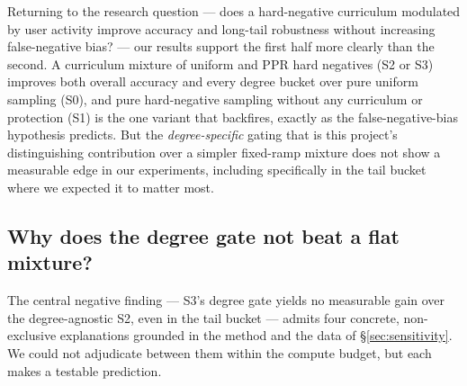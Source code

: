 \documentclass{article}
\begin{document}
Returning to the research question --- does a hard-negative curriculum modulated by user
activity improve accuracy and long-tail robustness without increasing false-negative
bias? --- our results support the first half more clearly than the second. A curriculum
mixture of uniform and PPR hard negatives (S2 or S3) improves both overall accuracy and
every degree bucket over pure uniform sampling (S0), and pure hard-negative sampling
without any curriculum or protection (S1) is the one variant that backfires, exactly as
the false-negative-bias hypothesis predicts. But the \emph{degree-specific} gating that
is this project's distinguishing contribution over a simpler fixed-ramp mixture does not
show a measurable edge in our experiments, including specifically in the tail bucket
where we expected it to matter most.

\subsection{Why does the degree gate not beat a flat mixture?}
\label{sec:whyS3}

The central negative finding --- S3's degree gate yields no measurable gain over the
degree-agnostic S2, even in the tail bucket --- admits four concrete, non-exclusive
explanations grounded in the method and the data of \S\ref{sec:sensitivity}. We could
not adjudicate between them within the compute budget, but each makes a testable
prediction.
\end{document}
